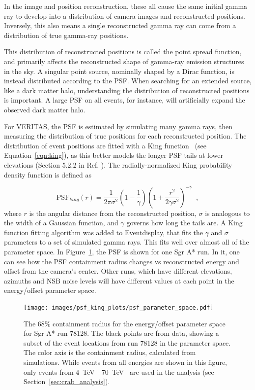     In the image and position reconstruction, these all cause the same initial gamma ray to develop into a distribution of camera images and reconstructed positions.
    Inversely, this also means a single reconstructed gamma ray can come from a distribution of true gamma-ray positions.

    This distribution of reconstructed positions is called the point spread function, and primarily affects the reconstructed shape of gamma-ray emission structures in the sky.
    A singular point source, nominally shaped by a Dirac function, is instead distributed according to the PSF.
    When searching for an extended source, like a dark matter halo, understanding the distribution of reconstructed positions is important.
    A large PSF on all events, for instance, will artificially expand the observed dark matter halo.

    For VERITAS, the PSF is estimated by simulating many gamma rays, then measuring the distribution of true positions for each reconstructed position.
    The distribution of event positions are fitted with a King function~\cite{king1962} (see Equation~\ref{eqn:king}), as this better models the longer PSF tails at lower elevations (Section 5.2.2 in Ref. \cite{Mayer2015}).
    The radially-normalized King probability density function is defined as

    \begin{equation} \label{eqn:king}
    \text{PSF}_{king}(r) = \frac{1}{2 \pi \sigma^{2} } \left( 1 - \frac{1}{\gamma} \right) \left( 1 + \frac{ r^{2} }{ 2 \gamma \sigma^{2} } \right)^{-\gamma} \;\;,
    \end{equation}
    where $r$ is the angular distance from the reconstructed position, $\sigma$ is analogous to the width of a Gaussian function, and $\gamma$ governs how long the tails are.
    A King function fitting algorithm was added to Eventdisplay, that fits the $\gamma$ and $\sigma$ parameters to a set of simulated gamma rays.
    This fits well over almost all of the parameter space.
    In Figure~\ref{fig:psf_paramspace}, the PSF is shown for one Sgr A* run.
    In it, one can see how the PSF containment radius changes vs reconstructed energy and offset from the camera's center.
    Other runs, which have different elevations, azimuths and NSB noise levels will have different values at each point in the energy/offset parameter space.

    \begin{figure}[!ht]
      \centering
      \texttt{[image: images/psf\_king\_plots/psf\_parameter\_space.pdf]}
      \caption[PSF Parameter Space]{
        The 68\% containment radius for the energy/offset parameter space for Sgr A* run 78128. 
        The black points are from data, showing a subset of the event locations from run 78128 in the parameter space.
        The color axis is the containment radius, calculated from simulations.
        While events from all energies are shown in this figure, only events from \SIrange{4}{70}{\TeV{}} are used in the analysis (see Section~\ref{sec:crab_analysis}).
      }
      \label{fig:psf_paramspace}
    \end{figure}

